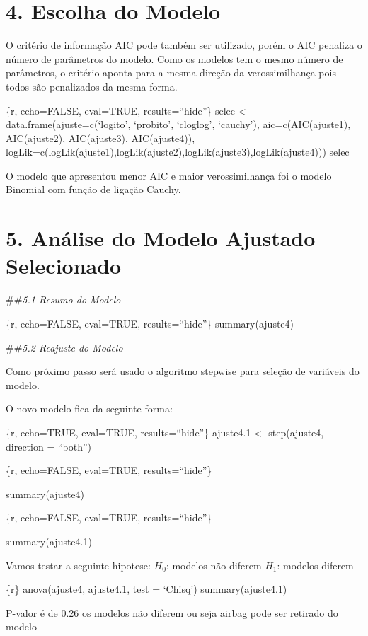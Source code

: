 \documentclass[
]{article}
\begin{document}
\hypertarget{escolha-do-modelo}{%
\section{4. Escolha do Modelo}\label{escolha-do-modelo}}

O critério de informação AIC pode também ser utilizado, porém o AIC
penaliza o número de parâmetros do modelo. Como os modelos tem o mesmo
número de parâmetros, o critério aponta para a mesma direção da
verossimilhança pois todos são penalizados da mesma forma.

\{r, echo=FALSE, eval=TRUE, results=``hide''\} selec \textless-
data.frame(ajuste=c(`logito', `probito', `cloglog', `cauchy'),
aic=c(AIC(ajuste1), AIC(ajuste2), AIC(ajuste3), AIC(ajuste4)),
logLik=c(logLik(ajuste1),logLik(ajuste2),logLik(ajuste3),logLik(ajuste4)))
selec

O modelo que apresentou menor AIC e maior verossimilhança foi o modelo
Binomial com função de ligação Cauchy.

\hypertarget{anuxe1lise-do-modelo-ajustado-selecionado}{%
\section{5. Análise do Modelo Ajustado
Selecionado}\label{anuxe1lise-do-modelo-ajustado-selecionado}}

\#\#\emph{5.1 Resumo do Modelo}

\{r, echo=FALSE, eval=TRUE, results=``hide''\} summary(ajuste4)

\#\#\emph{5.2 Reajuste do Modelo}

Como próximo passo será usado o algoritmo stepwise para seleção de
variáveis do modelo.

O novo modelo fica da seguinte forma:

\{r, echo=TRUE, eval=TRUE, results=``hide''\} ajuste4.1 \textless-
step(ajuste4, direction = ``both'')

\{r, echo=FALSE, eval=TRUE, results=``hide''\}

summary(ajuste4)

\{r, echo=FALSE, eval=TRUE, results=``hide''\}

summary(ajuste4.1)

Vamos testar a seguinte hipotese: \(H_0\): modelos não diferem \(H_1\):
modelos diferem

\{r\} anova(ajuste4, ajuste4.1, test = `Chisq') summary(ajuste4.1)

P-valor é de 0.26 os modelos não diferem ou seja airbag pode ser
retirado do modelo
\end{document}
